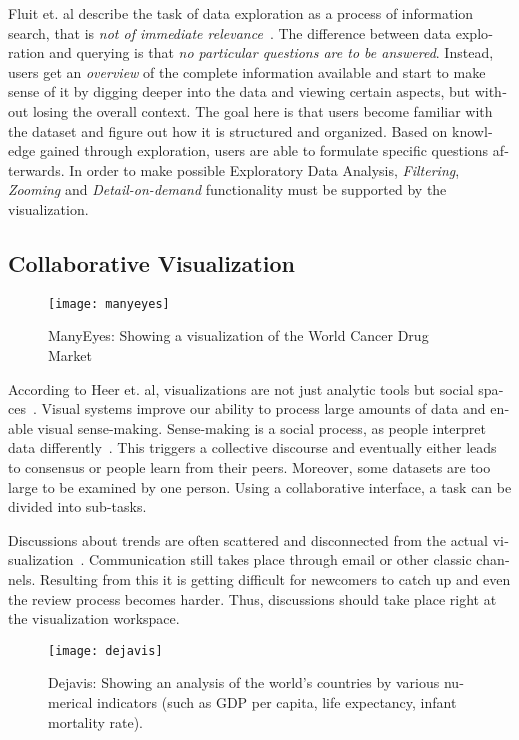 \begin{english}
Fluit et. al describe the task of data exploration as a process of information search, that is \emph{not of immediate relevance}~\cite{Fluit05}. The difference between data exploration and querying is that \emph{no particular questions are to be answered}. Instead, users get an \emph{overview} of the complete information available and start to make sense of it by digging deeper into the data and viewing certain aspects, but without losing the overall context. The goal here is that users become familiar with the dataset and figure out how it is structured and organized. Based on knowledge gained through exploration, users are able to formulate specific questions afterwards. In order to make possible Exploratory Data Analysis, \emph{Filtering}, \emph{Zooming} and \emph{Detail-on-demand} functionality must be supported by the visualization.

\subsection{Collaborative Visualization}

\begin{figure}
\centering
\texttt{[image: manyeyes]}
\caption{ManyEyes: Showing a visualization of the World Cancer Drug Market }
\label{fig:manyeyes}
\end{figure}

According to Heer et. al, visualizations are not just analytic tools but social spaces~\cite{voyagers-and-voyeurs,design-considerations-vast}. Visual systems improve our ability to process large amounts of data and enable visual sense-making. Sense-making is a social process, as people interpret data differently~\cite{card99}. This triggers a collective discourse and eventually either leads to consensus or people learn from their peers. Moreover, some datasets are too large to be examined by one person. Using a collaborative interface, a task can be divided into sub-tasks.

Discussions about trends are often scattered and disconnected from the actual visualization~\cite{voyagers-and-voyeurs}. Communication still takes place through email or other classic channels. Resulting from this it is getting difficult for newcomers to catch up and even the review process becomes harder. Thus, discussions should take place right at the visualization workspace.

\begin{figure}
\centering
\texttt{[image: dejavis]}
\caption{Dejavis: Showing an analysis of the world's countries by various numerical indicators (such as GDP per capita, life expectancy, infant mortality rate).}
\label{fig:dejavis}
\end{figure}


\end{english}
